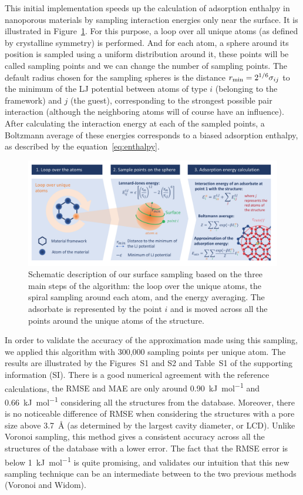 \documentclass[main]{subfiles}
\begin{document}
This initial implementation speeds up the calculation of adsorption enthalpy in nanoporous materials by sampling interaction energies only near the surface. It is illustrated in Figure~\ref{fgr:principle}. For this purpose, a loop over all unique atoms (as defined by crystalline symmetry) is performed. And for each atom, a sphere around its position is sampled using a uniform distribution around it, these points will be called sampling points and we can change the number of sampling points. The default radius chosen for the sampling spheres is the distance $r_{\text{min}}=2^{1/6}\sigma_{ij}$ to the minimum of the LJ potential between atoms of type $i$ (belonging to the framework) and $j$ (the guest), corresponding to the strongest possible pair interaction (although the neighboring atoms will of course have an influence). After calculating the interaction energy at each of the sampled points, a Boltzmann average of these energies corresponds to a biased adsorption enthalpy, as described by the equation~\ref{eq:enthalpy}.

\begin{figure}[ht]
\centering

  \includegraphics[clip, trim=0.6cm 0.74cm 0.78cm 0.6cm,width=0.95\linewidth]{figures/3-fastsim/Principe_screening.pdf}
  \caption{Schematic description of our surface sampling based on the three main steps of the algorithm: the loop over the unique atoms, the {spiral} sampling around each atom, and the energy averaging. {The adsorbate is represented by the point $i$ and is moved across all the points around the unique atoms of the structure. } }
  \label{fgr:principle}
\end{figure}

In order to validate the accuracy of the approximation made using this sampling, we applied this algorithm with 300,000 sampling points per unique atom. The results are illustrated by the Figures~S1 and S2 and Table~S1 of the supporting information (SI). There is a good numerical agreement with the reference calculations, {the RMSE and MAE are only around \SI{0.90}{\kilo\joule\per\mole} and \SI{0.66}{\kilo\joule\per\mole}} considering all the structures from the database. Moreover, there is no noticeable difference of RMSE when considering the structures with a pore size above \SI{3.7}{\angstrom} (as determined by the largest cavity diameter, or LCD). Unlike Voronoi sampling, this method gives a consistent accuracy across all the structures of the database with a lower error. The fact that the {RMSE} error is below \SI{1}{\kilo\joule\per\mole} is quite promising, and validates our intuition that this new sampling technique can be an intermediate between to the two previous methods (Voronoi and Widom).
\end{document}
